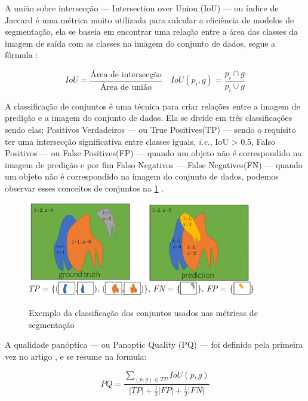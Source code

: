 
A união sobre intersecção — Intersection over Union (IoU) — ou índice de Jaccard é uma métrica muito utilizada para calcular a eficiência de modelos de segmentação, ela se baseia em encontrar uma relação entre a área das classes da imagem de saída com as classes na imagem do conjunto de dados, segue a fôrmula \cite{dp_semantic_segmantation, lapix, kirillov2019panoptic}:

$$ 
IoU = \frac{\text{Área de intersecção}}{\text{Área de união}} \quad IoU(p_i, g) = \frac{p_i \cap g}{ p_i \cup g}
$$


A classificação de conjuntos é uma técnica para criar relações entre a imagem de predição e a imagem do conjunto de dados. Ela se divide em três classificações sendo elas: Positivos Verdadeiros — ou True Positives(TP) — sendo o requisito ter uma intersecção significativa entre classes iguais, \emph{i.e.}, IoU > 0.5, Falso Positivos — ou False Positives(FP) — quando um objeto não é correspondido na imagem de predição e por fim Falso Negativos — False Negatives(FN) — quando um objeto não é correspondido na imagem do conjunto de dados, podemos observar esses conceitos de conjuntos na \cref{fig:conjuntos} \cite{kirillov2019panoptic}.
\begin{figure}[H]
	\caption{Exemplo da classificação dos conjuntos usados nas métricas de segmentação}
	\centering %
	\includegraphics[width=10cm]{figures/pan_metric.png} %
	\label{fig:conjuntos}
\end{figure}


A qualidade panóptica — ou Panoptic Quality (PQ) — foi definido pela primeira vez no artigo , e se resume na formula:

\begin{equation}
\label{eq:pq_metric}
PQ = \frac{\sum_{(p,g)\in TP}IoU(p,g)}{ |TP| + \frac{1}{2}|FP| + \frac{1}{2}|FN|}
\end{equation}

